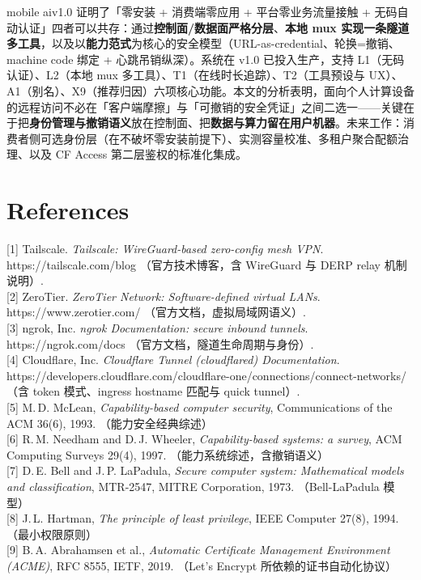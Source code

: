 \documentclass[10pt,a4paper]{article}
\newcommand{\sys}{mobile ai}
\begin{document}
\sys v1.0 证明了「零安装 + 消费端零应用 + 平台零业务流量接触 + 无码自动认证」四者可以共存：通过\textbf{控制面/数据面严格分层}、\textbf{本地 mux 实现一条隧道多工具}，以及以\textbf{能力范式}为核心的安全模型（URL-as-credential、轮换=撤销、machine code 绑定 + 心跳吊销纵深）。系统在 v1.0 已投入生产，支持 L1（无码认证）、L2（本地 mux 多工具）、T1（在线时长追踪）、T2（工具预设与 UX）、A1（别名）、X9（推荐归因）六项核心功能。本文的分析表明，面向个人计算设备的远程访问不必在「客户端摩擦」与「可撤销的安全凭证」之间二选一——关键在于把\textbf{身份管理与撤销语义}放在控制面、把\textbf{数据与算力留在用户机器}。未来工作：消费者侧可选身份层（在不破坏零安装前提下）、实测容量校准、多租户聚合配额治理、以及 CF Access 第二层鉴权的标准化集成。

\section*{References}
\noindent\sloppy\small
[1] Tailscale. \textit{Tailscale: WireGuard-based zero-config mesh VPN}. https://tailscale.com/blog （官方技术博客，含 WireGuard 与 DERP relay 机制说明）.\\[0.4em]
[2] ZeroTier. \textit{ZeroTier Network: Software-defined virtual LANs}. https://www.zerotier.com/ （官方文档，虚拟局域网语义）.\\[0.4em]
[3] ngrok, Inc. \textit{ngrok Documentation: secure inbound tunnels}. https://ngrok.com/docs （官方文档，隧道生命周期与身份）.\\[0.4em]
[4] Cloudflare, Inc. \textit{Cloudflare Tunnel (cloudflared) Documentation}. https://developers.cloudflare.com/cloudflare-one/connections/connect-networks/ （含 token 模式、ingress hostname 匹配与 quick tunnel）.\\[0.4em]
[5] M.\,D. McLean, \textit{Capability-based computer security}, Communications of the ACM 36(6), 1993. （能力安全经典综述）\\[0.4em]
[6] R.\,M. Needham and D.\,J. Wheeler, \textit{Capability-based systems: a survey}, ACM Computing Surveys 29(4), 1997. （能力系统综述，含撤销语义）\\[0.4em]
[7] D.\,E. Bell and J.\,P. LaPadula, \textit{Secure computer system: Mathematical models and classification}, MTR-2547, MITRE Corporation, 1973. （Bell-LaPadula 模型）\\[0.4em]
[8] J.\,L. Hartman, \textit{The principle of least privilege}, IEEE Computer 27(8), 1994. （最小权限原则）\\[0.4em]
[9] B.\,A. Abrahamsen et al., \textit{Automatic Certificate Management Environment (ACME)}, RFC 8555, IETF, 2019. （Let's Encrypt 所依赖的证书自动化协议）\\[0.4em]
\end{document}
